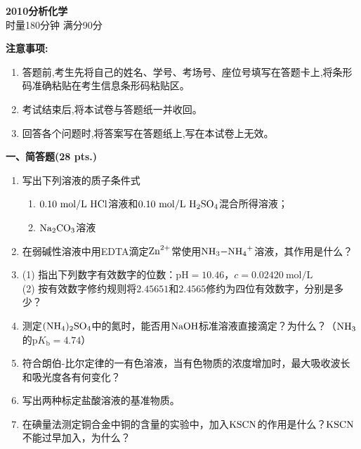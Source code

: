 \begin{center}
    {\LARGE \textbf{2010分析化学}} \\[2ex]
    {\large 时量180分钟 \quad 满分90分}
\end{center}

\vspace{0.5cm}
\noindent\textbf{注意事项:}
\begin{enumerate}[label=\arabic*., parsep=0pt, itemsep=0pt]
    \item 答题前,考生先将自己的姓名、学号、考场号、座位号填写在答题卡上,将条形码准确粘贴在考生信息条形码粘贴区。
    \item 考试结束后,将本试卷与答题纸一并收回。
    \item 回答各个问题时,将答案写在答题纸上,写在本试卷上无效。
\end{enumerate}

\vspace{0.5cm}
\noindent\textbf{一、简答题(28 pts.)}

\begin{enumerate}[label=\arabic*., itemsep=1.5ex]
    \item 写出下列溶液的质子条件式
    \begin{enumerate}[label=(\arabic*), noitemsep, topsep=0pt, partopsep=0pt]
        \item $0.10\ \mathrm{mol/L}\ \ce{HCl}$溶液和$0.10\ \mathrm{mol/L}\ \ce{H2SO4}$混合所得溶液；
        \item $\ce{Na2CO3}$溶液
    \end{enumerate}
    \item 在弱碱性溶液中用EDTA滴定$\ce{Zn^{2+}}$常使用$\ce{NH3-NH4+}$溶液，其作用是什么？
    \item (1) 指出下列数字有效数字的位数：$\mathrm{pH}=10.46$，$c=0.02420\ \mathrm{mol/L}$
    \\
    (2) 按有效数字修约规则将$2.45651$和$2.4565$修约为四位有效数字，分别是多少？
    \item 测定$\ce{(NH4)2SO4}$中的氮时，能否用$\ce{NaOH}$标准溶液直接滴定？为什么？（$\ce{NH3}$的$\mathrm{p}K_\mathrm{b}=4.74$）
    \item 符合朗伯-比尔定律的一有色溶液，当有色物质的浓度增加时，最大吸收波长和吸光度各有何变化？
    \item 写出两种标定盐酸溶液的基准物质。
    \item 在碘量法测定铜合金中铜的含量的实验中，加入$\ce{KSCN}$的作用是什么？$\ce{KSCN}$不能过早加入，为什么？
\end{enumerate}

